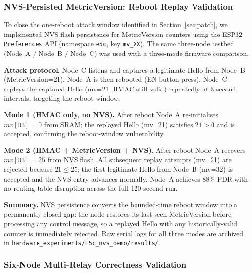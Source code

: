 \documentclass[preprint,12pt]{elsarticle}
\begin{document}

\subsubsection{NVS-Persisted MetricVersion: Reboot Replay Validation}
\label{sec:hardware-nvs}

To close the one-reboot attack window identified in Section~\ref{sec:patch},
we implemented NVS flash persistence for MetricVersion counters using the
ESP32 \texttt{Preferences} API (namespace \texttt{e5c}, key \texttt{mv\_XX}).
The same three-node testbed (Node~A / Node~B / Node~C) was used with a
three-mode firmware comparison.

\textbf{Attack protocol.}
Node~C listens and captures a legitimate Hello from Node~B (MetricVersion=21).
Node~A is then rebooted (EN button press).
Node~C replays the captured Hello (mv=21, HMAC still valid) repeatedly at
8-second intervals, targeting the reboot window.

\textbf{Mode 1 (HMAC only, no NVS).}
After reboot Node~A re-initialises $mv[\texttt{BB}]=0$ from SRAM;
the replayed Hello (mv=21) satisfies $21 > 0$ and is accepted,
confirming the reboot-window vulnerability.

\textbf{Mode 2 (HMAC + MetricVersion + NVS).}
After reboot Node~A recovers $mv[\texttt{BB}]=25$ from NVS flash.
All subsequent replay attempts (mv=21) are rejected because
$21 \leq 25$; the first legitimate Hello from Node~B (mv=32)
is accepted and the NVS entry advances normally.
Node~A achieves 88\% PDR with no routing-table disruption across
the full 120-second run.

\textbf{Summary.}
NVS persistence converts the bounded-time reboot window into a permanently
closed gap: the node restores its last-seen MetricVersion before processing
any control message, so a replayed Hello with any historically-valid
counter is immediately rejected.
Raw serial logs for all three modes are archived in
\texttt{hardware\_experiments/E5c\_nvs\_demo/results/}.

\subsubsection{Six-Node Multi-Relay Correctness Validation}
\label{sec:hardware-e6}
\end{document}
